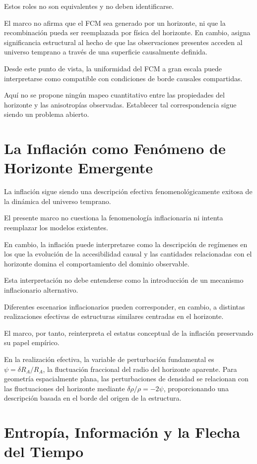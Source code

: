 \documentclass[12pt,a4paper]{article}
\begin{document}
Estos roles no son equivalentes y no deben identificarse.

El marco no afirma que el FCM sea generado por un horizonte, ni que la recombinación pueda ser reemplazada por física del horizonte. En cambio, asigna significancia estructural al hecho de que las observaciones presentes acceden al universo temprano a través de una superficie causalmente definida.

Desde este punto de vista, la uniformidad del FCM a gran escala puede interpretarse como compatible con condiciones de borde causales compartidas.

Aquí no se propone ningún mapeo cuantitativo entre las propiedades del horizonte y las anisotropías observadas. Establecer tal correspondencia sigue siendo un problema abierto.

\section{La Inflación como Fenómeno de Horizonte Emergente}

La inflación sigue siendo una descripción efectiva fenomenológicamente exitosa de la dinámica del universo temprano.

El presente marco no cuestiona la fenomenología inflacionaria ni intenta reemplazar los modelos existentes.

En cambio, la inflación puede interpretarse como la descripción de regímenes en los que la evolución de la accesibilidad causal y las cantidades relacionadas con el horizonte domina el comportamiento del dominio observable.

Esta interpretación no debe entenderse como la introducción de un mecanismo inflacionario alternativo.

Diferentes escenarios inflacionarios pueden corresponder, en cambio, a distintas realizaciones efectivas de estructuras similares centradas en el horizonte.

El marco, por tanto, reinterpreta el estatus conceptual de la inflación preservando su papel empírico.

En la realización efectiva, la variable de perturbación fundamental es $\psi = \delta R_A / R_A$, la fluctuación fraccional del radio del horizonte aparente. Para geometría espacialmente plana, las perturbaciones de densidad se relacionan con las fluctuaciones del horizonte mediante $\delta\rho/\rho = -2\psi$, proporcionando una descripción basada en el borde del origen de la estructura.

\section{Entropía, Información y la Flecha del Tiempo}
\end{document}
